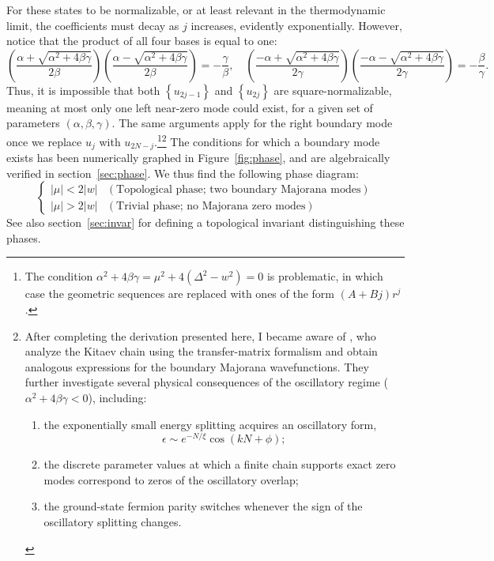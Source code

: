 \documentclass{article}
\begin{document}
For these states to be normalizable, or at least relevant in the thermodynamic limit,
the coefficients must decay as $j$ increases, evidently exponentially.
However, notice that the product of all four bases is equal to one:
\[
    \left(\frac{\alpha+\sqrt{\alpha^2+4\beta\gamma}}{2\beta}\right)
    \left(\frac{\alpha-\sqrt{\alpha^2+4\beta\gamma}}{2\beta}\right)
    = -\frac{\gamma}{\beta},\quad
    \left(\frac{-\alpha+\sqrt{\alpha^2+4\beta\gamma}}{2\gamma}\right)
    \left(\frac{-\alpha-\sqrt{\alpha^2+4\beta\gamma}}{2\gamma}\right)
    = -\frac{\beta}{\gamma}.
\]
Thus, it is impossible that both $\left\{u_{2j-1}\right\}$ and $\left\{u_{2j}\right\}$ are square-normalizable,
meaning at most only one left near-zero mode could exist, for a given set of parameters $(\alpha, \beta, \gamma)$.
The same arguments apply for the right boundary mode once we replace $u_{j}$ with $u_{2N-j}$.\footnote{%
The condition $\alpha^2+4\beta\gamma = \mu^2 + 4\left(\Delta^2 - w^2\right) = 0$ is problematic,
in which case the geometric sequences are replaced with ones of the form $(A+Bj)r^j$.
}\footnote{%
After completing the derivation presented here, I became aware of \textcite{hedge_vishveshwara},
who analyze the Kitaev chain using the transfer-matrix formalism
and obtain analogous expressions for the boundary Majorana wavefunctions.
They further investigate several physical consequences
of the oscillatory regime ($\alpha^2+4\beta\gamma<0$), including:
\begin{enumerate}
    \item the exponentially small energy splitting acquires an oscillatory form,
    \[
        \epsilon \sim e^{-N/\xi}\cos(kN+\phi);
    \]
    \item the discrete parameter values at which a finite chain supports exact
    zero modes correspond to zeros of the oscillatory overlap;
    \item the ground-state fermion parity switches whenever the sign of the
    oscillatory splitting changes.
\end{enumerate}
}
The conditions for which a boundary mode exists has been numerically graphed in Figure~\ref{fig:phase},
and are algebraically verified in section~\ref{sec:phase}.
We thus find the following phase diagram:
\[
    \begin{cases}
        |\mu| < 2|w| & (\text{Topological phase; two boundary Majorana modes}) \\
        |\mu| > 2|w| & (\text{Trivial phase; no Majorana zero modes})
    \end{cases}
\]
See also section~\ref{sec:invar} for defining a topological invariant distinguishing these phases.
\end{document}
